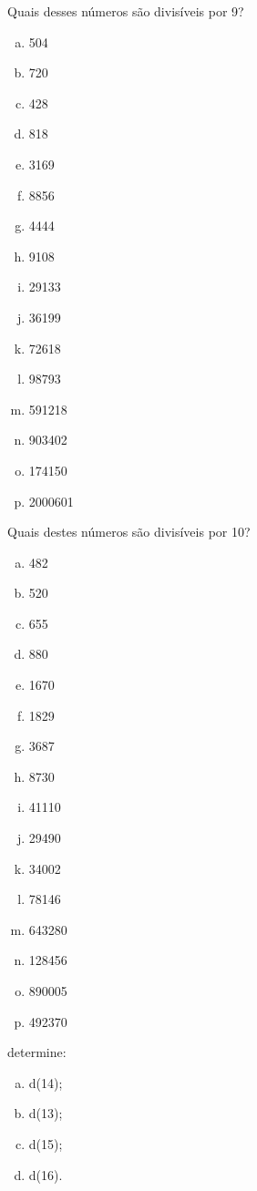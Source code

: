 \item Quais desses números são divisíveis por 9?
\begin{multicols}{4}
\begin{enumerate}[a)]
	\item 504
	\item 720
	\item 428
	\item 818
	\item 3169
	\item 8856
	\item 4444
	\item 9108
	\item 29133
	\item 36199
	\item 72618
	\item 98793
	\item 591218
	\item 903402
	\item 174150
	\item 2000601
\end{enumerate}
\end{multicols}

\item Quais destes números são divisíveis por 10?
\begin{multicols}{4}
\begin{enumerate}[a)]
	\item 482
	\item 520
	\item 655
	\item 880
	\item 1670
	\item 1829
	\item 3687
	\item 8730
	\item 41110
	\item 29490
	\item 34002
	\item 78146
	\item 643280
	\item 128456
	\item 890005
	\item 492370
\end{enumerate}
\end{multicols}

\item determine:
\begin{multicols}{4}
\begin{enumerate}[a)]
	\item d(14);
	\item d(13);
	\item d(15);
	\item d(16).
\end{enumerate}
\end{multicols}

